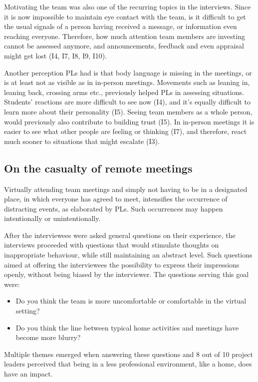 Motivating the team was also one of the recurring topics in the interviews. Since it is now impossible to maintain eye contact with the team, is it difficult to get the usual signals of a person having received a message, or information even reaching everyone. Therefore, how much attention team members are investing cannot be assessed anymore, and announcements, feedback and even appraisal might get lost (I4, I7, I8, I9, I10).

Another perception PLs had is that body language is missing in the meetings, or is at least not as visible as in in-person meetings. Movements such as leaning in, leaning back, crossing arms etc., previously helped PLs in assessing situations. Students' reactions are more difficult to see now (I4), and it's equally difficult to learn more about their personality (I5). Seeing team members as a whole person, would previously also contribute to building trust (I5). In in-person meetings it is easier to see what other people are feeling or thinking (I7), and therefore, react much sooner to situations that might escalate (I3).

\subsection{On the casualty of remote meetings}

Virtually attending team meetings and simply not having to be in a designated place, in which everyone has agreed to meet, intensifies the occurrence of distracting events, as elaborated by PLs. Such occurrences may happen intentionally or unintentionally. 

After the interviewees were asked general questions on their experience, the interviews proceeded with questions that would stimulate thoughts on inappropriate behaviour, while still maintaining an abstract level. Such questions aimed at offering the interviewees the possibility to express their impressions openly, without being biased by the interviewer. The questions serving this goal were:

\begin{itemize}
\item Do you think the team is more uncomfortable or comfortable in the virtual setting?
\item Do you think the line between typical home activities and meetings have become more blurry?
\end{itemize}

Multiple themes emerged when answering these questions and 8 out of 10 project leaders perceived that being in a less professional environment, like a home, does have an impact.

